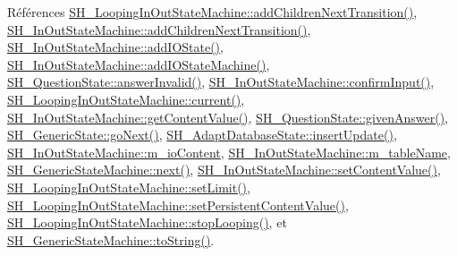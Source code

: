 Références \hyperlink{classSH__LoopingInOutStateMachine_abfae9f47019379f270496de46845c729}{S\-H\-\_\-\-Looping\-In\-Out\-State\-Machine\-::add\-Children\-Next\-Transition()}, \hyperlink{classSH__InOutStateMachine_aa78420f8778d7777809aad77eb8473b4}{S\-H\-\_\-\-In\-Out\-State\-Machine\-::add\-Children\-Next\-Transition()}, \hyperlink{classSH__InOutStateMachine_a2528cffddbe6f98c32ebef41423c0118}{S\-H\-\_\-\-In\-Out\-State\-Machine\-::add\-I\-O\-State()}, \hyperlink{classSH__InOutStateMachine_a6f65dff277508e650eb697628c857b19}{S\-H\-\_\-\-In\-Out\-State\-Machine\-::add\-I\-O\-State\-Machine()}, \hyperlink{classSH__QuestionState_a3348a8a683130678ac87a10ba2a25486}{S\-H\-\_\-\-Question\-State\-::answer\-Invalid()}, \hyperlink{classSH__InOutStateMachine_a7f7d9c9300c1d05bce2c26029f28cc31}{S\-H\-\_\-\-In\-Out\-State\-Machine\-::confirm\-Input()}, \hyperlink{classSH__LoopingInOutStateMachine_afce58401195a4941b1939c46f1caa23b}{S\-H\-\_\-\-Looping\-In\-Out\-State\-Machine\-::current()}, \hyperlink{classSH__InOutStateMachine_aa1a3bd3c0ea8a59b9bc916dc718eb9ca}{S\-H\-\_\-\-In\-Out\-State\-Machine\-::get\-Content\-Value()}, \hyperlink{classSH__QuestionState_a29cdea8bc55e39e3ed02d24743c30f8c}{S\-H\-\_\-\-Question\-State\-::given\-Answer()}, \hyperlink{classSH__GenericState_a34c1bebc765cc3a62d66c94c37d4f0c3}{S\-H\-\_\-\-Generic\-State\-::go\-Next()}, \hyperlink{classSH__AdaptDatabaseState_a037db544ea05f42d21fcbdda758839fe}{S\-H\-\_\-\-Adapt\-Database\-State\-::insert\-Update()}, \hyperlink{classSH__InOutStateMachine_a8cfbc27eef057bf37b7711bdfef2077e}{S\-H\-\_\-\-In\-Out\-State\-Machine\-::m\-\_\-io\-Content}, \hyperlink{classSH__InOutStateMachine_aa009eecc5ab6181358faafb5996b6006}{S\-H\-\_\-\-In\-Out\-State\-Machine\-::m\-\_\-table\-Name}, \hyperlink{classSH__GenericStateMachine_af4771d31d87951c997fba1633c2d67f6}{S\-H\-\_\-\-Generic\-State\-Machine\-::next()}, \hyperlink{classSH__InOutStateMachine_a9ab1534306b2bdb62743d4bcefe40c17}{S\-H\-\_\-\-In\-Out\-State\-Machine\-::set\-Content\-Value()}, \hyperlink{classSH__LoopingInOutStateMachine_a6dbf2fbcc6524bba5a70baadb8d61be4}{S\-H\-\_\-\-Looping\-In\-Out\-State\-Machine\-::set\-Limit()}, \hyperlink{classSH__LoopingInOutStateMachine_a99686121d80e3de4c64bebb1d5890ac0}{S\-H\-\_\-\-Looping\-In\-Out\-State\-Machine\-::set\-Persistent\-Content\-Value()}, \hyperlink{classSH__LoopingInOutStateMachine_a73d75e30318da22fec99387e9bf02a9b}{S\-H\-\_\-\-Looping\-In\-Out\-State\-Machine\-::stop\-Looping()}, et \hyperlink{classSH__GenericStateMachine_a85c0c1c9d258ae991f84667412fa47cd}{S\-H\-\_\-\-Generic\-State\-Machine\-::to\-String()}.


